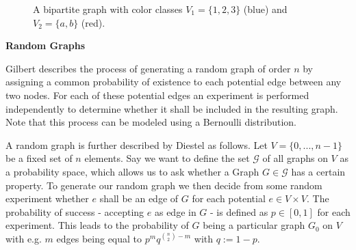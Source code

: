\begin{figure}[h]
    \centering
    \caption[Example of a bipartite graph]{A bipartite graph with color classes $V_1 = \{1,2,3\}$ (blue) and $V_2=\{a,b\}$ (red).}
    \label{fig:bipartite-colored}
\end{figure}

\textbf{Random Graphs}\par
\label{sec:random-graphs}
Gilbert \cite{gilbert1959random} describes the process of generating a random graph of order $n$ by assigning a common probability of existence to each potential edge between any two nodes. For each of these potential edges an experiment is performed independently to determine whether it shall be included in the resulting graph. Note that this process can be modeled using a Bernoulli distribution.

A random graph is further described by Diestel \cite{Diestel2017} as follows. Let $V = \{0,...,n-1\}$ be a fixed set of $n$ elements. Say we want to define the set $\mathcal{G}$ of all graphs on $V$ as a probability space, which allows us to ask whether a Graph $G \in \mathcal{G}$ has a certain property. To generate our random graph we then decide from some random experiment whether $e$ shall be an edge of $G$ for each potential $e \in V \times V$. The probability of success - accepting $e$ as edge in $G$ - is defined as $p \in [0,1]$ for each experiment. This leads to the probability of $G$ being a particular graph $G_0$ on $V$ with e.g. $m$ edges being equal to $p^m q^{\binom{n}{2}-m}$ with $q:=1-p$.
\bigskip


